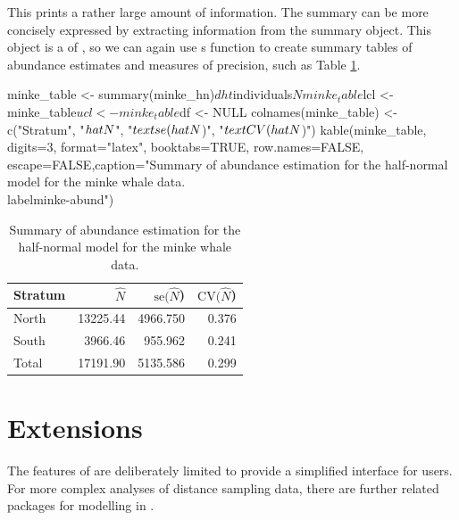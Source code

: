 \documentclass[article]{jss}
\begin{document}
This prints a rather large amount of information. The summary can be
more concisely expressed by extracting information from the summary
object. This object is a  of , so we can
again use s  function to create summary tables of
abundance estimates and measures of precision, such as Table
\ref{minke-abund}.

\begin{CodeChunk}
\begin{CodeInput}
minke_table <- summary(minke_hn)$dht$individuals$N
minke_table$lcl <- minke_table$ucl <- minke_table$df <- NULL
colnames(minke_table) <- c("Stratum", "$\\hat{N}$", "$\\text{se}(\\hat{N}$)", 
                           "$\\text{CV}(\\hat{N}$)")
kable(minke_table, digits=3, format="latex", booktabs=TRUE,
      row.names=FALSE, escape=FALSE,caption="Summary of abundance estimation for the half-normal model for the minke whale data.\\label{minke-abund}")
\end{CodeInput}
\begin{table}

\caption{Summary of abundance estimation for the half-normal model for the minke whale data.\label{minke-abund}}
\begin{tabular}{lrrr}
\toprule
Stratum & $\hat{N}$ & $\text{se}(\hat{N}$) & $\text{CV}(\hat{N}$)\\
\midrule
North & 13225.44 & 4966.750 & 0.376\\
South & 3966.46 & 955.962 & 0.241\\
Total & 17191.90 & 5135.586 & 0.299\\
\bottomrule
\end{tabular}
\end{table}

\end{CodeChunk}

\section{Extensions}\label{extensions}

The features of  are deliberately limited to provide a
simplified interface for users. For more complex analyses of distance
sampling data, there are further related packages for modelling in
.
\end{document}

